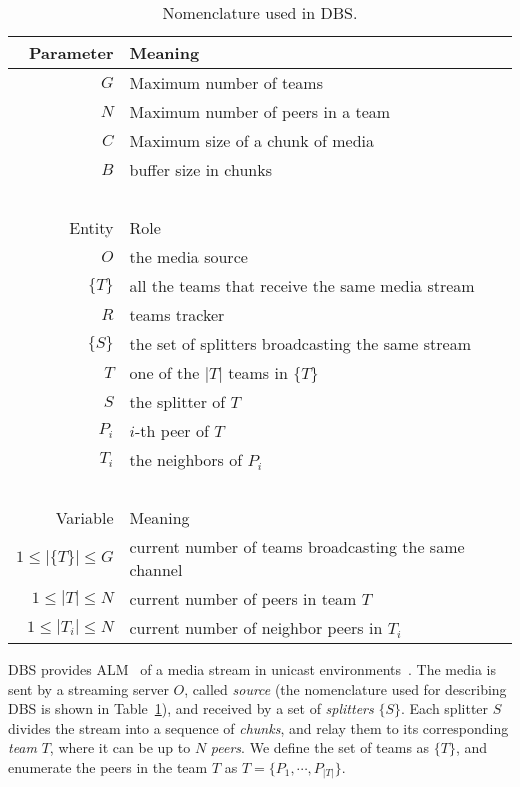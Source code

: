 \label{sec:DBS}

\begin{table}
  \begin{tabular}{rl}
    Parameter & Meaning \\
    \hline
    $G$       & Maximum number of teams \\
    $N$       & Maximum number of peers in a team \\
    $C$       & Maximum size of a chunk of media \\
    $B$       & buffer size in chunks \\
    ~\\
    Entity  & Role \\
    \hline
    $O$     & the media source \\
    $\{T\}$ & all the teams that receive the same media stream \\
    $R$     & teams tracker \\
    $\{S\}$ & the set of splitters broadcasting the same stream \\
    $T$     & one of the $|T|$ teams in $\{T\}$ \\
    $S$     & the splitter of $T$ \\
    $P_i$   & $i$-th peer of $T$ \\
    $T_i$   & the neighbors of $P_i$ \\
    ~\\
    Variable            & Meaning \\
    \hline
    $1\leq |\{T\}|\leq G$ & current number of teams broadcasting the same channel \\
    $1\leq |T|\leq N$     & current number of peers in team $T$ \\
    $1\leq |T_i|\leq N$   & current number of neighbor peers in $T_i$ \\
  \end{tabular}
  \caption{Nomenclature used in DBS.\label{tab:DBS_nomenclature}}
\end{table}

DBS provides ALM~\cite{banerjee2002scalable} of a media stream in
unicast environments~\cite{comer2003computer}. The media is sent by a
streaming server $O$, called \emph{source} (the nomenclature used for
describing DBS is shown in Table~\ref{tab:DBS_nomenclature}), and
received by a set of \emph{splitters} $\{S\}$.
Each splitter $S$ divides the stream into a sequence of
\emph{chunks}, and relay them to its corresponding \emph{team} $T$,
where it can be up to $N$ \emph{peers}. We define the set of teams as
$\{T\}$,
and enumerate the peers in the team $T$ as $T=\{P_1,\cdots,P_{|T|}\}$.

